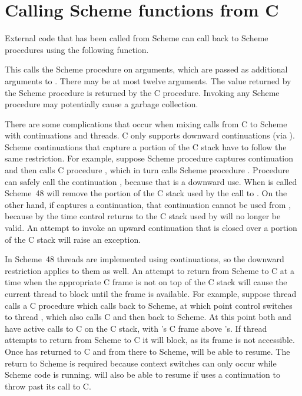 \section{Calling Scheme functions from C}
\label{sec:external-callback}

External code that has been called from Scheme can call back to Scheme
 procedures using the following function.

\begin{protos}
\end{protos}
\noindent{}This calls the Scheme procedure  on 
 arguments, which are passed as additional arguments to .
There may be at most twelve arguments.
The value returned by the Scheme procedure is returned by the C procedure.
Invoking any Scheme procedure may potentially cause a garbage collection.

There are some complications that occur when mixing calls from C to Scheme
 with continuations and threads.
C only supports downward continuations (via ).
Scheme continuations that capture a portion of the C stack have to follow the
 same restriction.
For example, suppose Scheme procedure  captures continuation 
 and then calls C procedure , which in turn calls Scheme procedure
 .
Procedure  can safely call the continuation , because that
 is a downward use.
When  is called Scheme~48 will remove the portion of the C stack used
 by the call to .
On the other hand, if  captures a continuation, that continuation
 cannot be used from , because by the time control returns to
  the C stack used by  will no longer be valid.
An attempt to invoke an upward continuation that is closed over a portion
 of the C stack will raise an exception.

In Scheme~48 threads are implemented using continuations, so the downward
 restriction applies to them as well.
An attempt to return from Scheme to C at a time when the appropriate
 C frame is not on top of the C stack will cause the current thread to
 block until the frame is available.
For example, suppose thread  calls a C procedure which calls back
 to Scheme, at which point control switches to thread , which also
 calls C and then back to Scheme.
At this point both  and  have active calls to C on the
 C stack, with 's C frame above 's.
If thread  attempts to return from Scheme to C it will block,
 as its frame is not accessible.
Once  has returned to C and from there to Scheme,  will
 be able to resume.
The return to Scheme is required because context switches can only occur while
 Scheme code is running.
 will also be able to resume if  uses a continuation to
 throw past its call to C.

